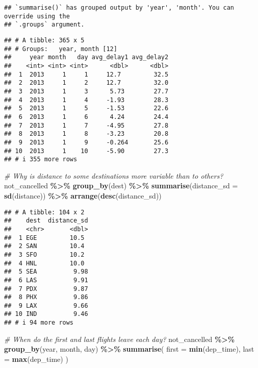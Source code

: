 \documentclass[
]{article}
\newenvironment{Shaded}{\begin{snugshade}}{\end{snugshade}}
\newcommand{\AttributeTok}[1]{\textcolor[rgb]{0.13,0.29,0.53}{#1}}
\newcommand{\CommentTok}[1]{\textcolor[rgb]{0.56,0.35,0.01}{\textit{#1}}}
\newcommand{\FunctionTok}[1]{\textcolor[rgb]{0.13,0.29,0.53}{\textbf{#1}}}
\newcommand{\NormalTok}[1]{#1}
\newcommand{\SpecialCharTok}[1]{\textcolor[rgb]{0.81,0.36,0.00}{\textbf{#1}}}
\begin{document}
\begin{verbatim}
## `summarise()` has grouped output by 'year', 'month'. You can override using the
## `.groups` argument.
\end{verbatim}

\begin{verbatim}
## # A tibble: 365 x 5
## # Groups:   year, month [12]
##     year month   day avg_delay1 avg_delay2
##    <int> <int> <int>      <dbl>      <dbl>
##  1  2013     1     1     12.7         32.5
##  2  2013     1     2     12.7         32.0
##  3  2013     1     3      5.73        27.7
##  4  2013     1     4     -1.93        28.3
##  5  2013     1     5     -1.53        22.6
##  6  2013     1     6      4.24        24.4
##  7  2013     1     7     -4.95        27.8
##  8  2013     1     8     -3.23        20.8
##  9  2013     1     9     -0.264       25.6
## 10  2013     1    10     -5.90        27.3
## # i 355 more rows
\end{verbatim}

\begin{Shaded}
\begin{Highlighting}[]
\CommentTok{\# Why is distance to some destinations more variable than to others?}
\NormalTok{not\_cancelled }\SpecialCharTok{\%\textgreater{}\%} 
  \FunctionTok{group\_by}\NormalTok{(dest) }\SpecialCharTok{\%\textgreater{}\%} 
  \FunctionTok{summarise}\NormalTok{(}\AttributeTok{distance\_sd =} \FunctionTok{sd}\NormalTok{(distance)) }\SpecialCharTok{\%\textgreater{}\%} 
  \FunctionTok{arrange}\NormalTok{(}\FunctionTok{desc}\NormalTok{(distance\_sd))}
\end{Highlighting}
\end{Shaded}

\begin{verbatim}
## # A tibble: 104 x 2
##    dest  distance_sd
##    <chr>       <dbl>
##  1 EGE         10.5 
##  2 SAN         10.4 
##  3 SFO         10.2 
##  4 HNL         10.0 
##  5 SEA          9.98
##  6 LAS          9.91
##  7 PDX          9.87
##  8 PHX          9.86
##  9 LAX          9.66
## 10 IND          9.46
## # i 94 more rows
\end{verbatim}

\begin{Shaded}
\begin{Highlighting}[]
\CommentTok{\# When do the first and last flights leave each day?}
\NormalTok{not\_cancelled }\SpecialCharTok{\%\textgreater{}\%} 
  \FunctionTok{group\_by}\NormalTok{(year, month, day) }\SpecialCharTok{\%\textgreater{}\%} 
  \FunctionTok{summarise}\NormalTok{(}
    \AttributeTok{first =} \FunctionTok{min}\NormalTok{(dep\_time),}
    \AttributeTok{last =} \FunctionTok{max}\NormalTok{(dep\_time)}
\NormalTok{  )}
\end{Highlighting}
\end{Shaded}
\end{document}

